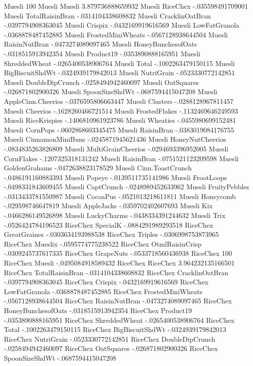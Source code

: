 Muesli	100%
Muesli	Muesli	3.879736888659932
Muesli	RiceChex	-.035598491709001
Muesli	TotalRaisinBran	-.0314104338608832
Muesli	CracklinOatBran	-.0397794908363045
Muesli	Crispix	-.0432169919616569
Muesli	LowFatGranola	-.0368878487452885
Muesli	FrostedMiniWheats	-.0567128938644504
Muesli	RaisinNutBran	-.0473274089097465
Muesli	HoneyBunchesofOats	-.0318515913942354
Muesli	Product19	-.0353890888165951
Muesli	ShreddedWheat	-.0265400538906764
Muesli	Total	-.1002263479150115
Muesli	BigBiscuitShdWt	-.0324939179842013
Muesli	NutriGrain	-.0523330772142851
Muesli	DoubleDipCrunch	-.0258494942460097
Muesli	OatSquares	-.026871802900326
Muesli	SpoonSizeShdWt	-.0687594415047208
Muesli	AppleCinn.Cheerios	-.0376595806663447
Muesli	Clusters	-.0288128967811457
Muesli	Cheerios	-.1628260466721514
Muesli	FrostedFlakes	-.1132469646249593
Muesli	RiceKrispies	-.1406810961923786
Muesli	Wheaties	-.0455980699152481
Muesli	CornPops	-.0602868603345475
Muesli	RaisinBran	-.0383019084176755
Muesli	CinnamonMiniBuns	-.0245871945621436
Muesli	HoneyNutCheerios	-.0834835263826809
Muesli	MultiGrainCheerios	-.0294693396952005
Muesli	CornFlakes	-.1207325318131242
Muesli	RaisinBran	-.0751521123209598
Muesli	GoldenGrahams	-.0472638823178529
Muesli	Cinn.ToastCrunch	-.0486191160883393
Muesli	Popeye	-.0139511735141986
Muesli	FrootLoops	-.0498331843609455
Muesli	CaptCrunch	-.0248989452633962
Muesli	FruityPebbles	-.0313433781550987
Muesli	CocoaPus	-.0521013218611811
Muesli	Honeycomb	-.029598746647819
Muesli	AppleJacks	-.0359702402607693
Muesli	Kix	-.0466286149526898
Muesli	LuckyCharms	-.0438334391244632
Muesli	Trix	-.0526424784196523
RiceChex	SpecialK	-.0884291989293518
RiceChex	GreatGraines	-.0303634193988538
RiceChex	Triples	-.0306998753873965
RiceChex	Mueslix	-.0595774775238522
RiceChex	OtmlRaisinCrisp	-.0309245737617335
RiceChex	GrapeNuts	-.0533718560436938
RiceChex	100%
RiceChex	Muesli	-.0495084918589432
RiceChex	RiceChex	3.964232135166501
RiceChex	TotalRaisinBran	-.0314104338608832
RiceChex	CracklinOatBran	-.0397794908363045
RiceChex	Crispix	-.0432169919616569
RiceChex	LowFatGranola	-.0368878487452885
RiceChex	FrostedMiniWheats	-.0567128938644504
RiceChex	RaisinNutBran	-.0473274089097465
RiceChex	HoneyBunchesofOats	-.0318515913942354
RiceChex	Product19	-.0353890888165951
RiceChex	ShreddedWheat	-.0265400538906764
RiceChex	Total	-.1002263479150115
RiceChex	BigBiscuitShdWt	-.0324939179842013
RiceChex	NutriGrain	-.0523330772142851
RiceChex	DoubleDipCrunch	-.0258494942460097
RiceChex	OatSquares	-.026871802900326
RiceChex	SpoonSizeShdWt	-.0687594415047208
